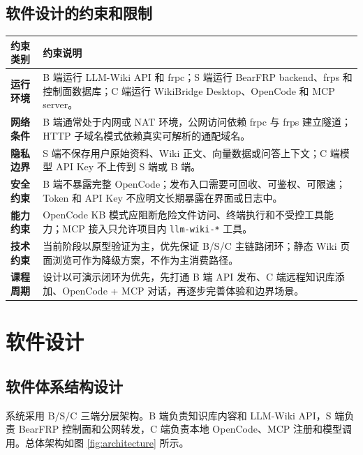 \documentclass[UTF8,a4paper,12pt,fontset=fandol]{ctexart}
\newcommand{\code}[1]{\texttt{\footnotesize #1}}
\begin{document}
\subsection{软件设计的约束和限制}
\begin{longtable}{>{\bfseries}p{3.2cm}p{11.0cm}}
\toprule
约束类别 & 约束说明 \\
\midrule
运行环境 & B 端运行 LLM-Wiki API 和 frpc；S 端运行 BearFRP backend、frps 和控制面数据库；C 端运行 WikiBridge Desktop、OpenCode 和 MCP server。 \\
网络条件 & B 端通常处于内网或 NAT 环境，公网访问依赖 frpc 与 frps 建立隧道；HTTP 子域名模式依赖真实可解析的通配域名。 \\
隐私边界 & S 端不保存用户原始资料、Wiki 正文、向量数据或问答上下文；C 端模型 API Key 不上传到 S 端或 B 端。 \\
安全约束 & B 端不暴露完整 OpenCode；发布入口需要可回收、可鉴权、可限速；Token 和 API Key 不应明文长期暴露在界面或日志中。 \\
能力约束 & OpenCode KB 模式应阻断危险文件访问、终端执行和不受控工具能力；MCP 接入只允许项目内 \code{llm-wiki-*} 工具。 \\
技术约束 & 当前阶段以原型验证为主，优先保证 B/S/C 主链路闭环；静态 Wiki 页面浏览可作为降级方案，不作为主消费路径。 \\
课程周期 & 设计以可演示闭环为优先，先打通 B 端 API 发布、C 端远程知识库添加、OpenCode + MCP 对话，再逐步完善体验和边界场景。 \\
\bottomrule
\end{longtable}

\section{软件设计}

\subsection{软件体系结构设计}
系统采用 B/S/C 三端分层架构。B 端负责知识库内容和 LLM-Wiki API，S 端负责 BearFRP 控制面和公网转发，C 端负责本地 OpenCode、MCP 注册和模型调用。总体架构如图 \ref{fig:architecture} 所示。
\end{document}
